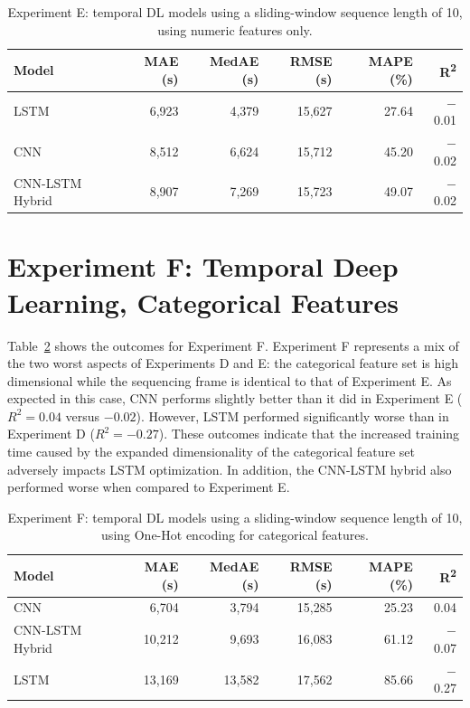 \begin{table}[H]
\centering
\caption[Results for Experiment E]{Experiment E: temporal DL models using a sliding-window sequence length of 10, using numeric features only.}
\label{tab:expe-full}
\begin{tabular}{lrrrrr}
\hline
\textbf{Model} & \textbf{MAE (s)} & \textbf{MedAE (s)} & \textbf{RMSE (s)} & \textbf{MAPE (\%)} & \textbf{R\textsuperscript{2}} \\ 
\hline
LSTM            & 6{,}923 & 4{,}379 & 15{,}627 & 27.64 & $-$0.01 \\ 
CNN             & 8{,}512 & 6{,}624 & 15{,}712 & 45.20 & $-$0.02 \\ 
CNN-LSTM Hybrid & 8{,}907 & 7{,}269 & 15{,}723 & 49.07 & $-$0.02 \\ 
\hline
\end{tabular}
\end{table}

\clearpage
\section{Experiment F: Temporal Deep Learning, Categorical Features}

Table~\ref{tab:expf-full} shows the outcomes for Experiment F. Experiment F represents a mix of the two worst aspects of Experiments D and E: the categorical feature set is high dimensional while the sequencing frame is identical to that of Experiment E. As expected in this case, CNN performs slightly better than it did in Experiment E ($R^2 = 0.04$ versus $-0.02$). However, LSTM performed significantly worse than in Experiment D ($R^2 = -0.27$). These outcomes indicate that the increased training time caused by the expanded dimensionality of the categorical feature set adversely impacts LSTM optimization. In addition, the CNN-LSTM hybrid also performed worse when compared to Experiment E.

\begin{table}[H]
\centering
\caption[Results for Experiment F]{Experiment F: temporal DL models using a sliding-window sequence length of 10, using One-Hot encoding for categorical features.}
\label{tab:expf-full}
\begin{tabular}{lrrrrr}
\hline
\textbf{Model} & \textbf{MAE (s)} & \textbf{MedAE (s)} & \textbf{RMSE (s)} & \textbf{MAPE (\%)} & \textbf{R\textsuperscript{2}} \\ 
\hline
CNN             & 6{,}704 & 3{,}794 & 15{,}285 & 25.23 & 0.04 \\ 
CNN-LSTM Hybrid & 10{,}212 & 9{,}693 & 16{,}083 & 61.12 & $-$0.07 \\ 
LSTM            & 13{,}169 & 13{,}582 & 17{,}562 & 85.66 & $-$0.27 \\ 
\hline
\end{tabular}
\end{table}
